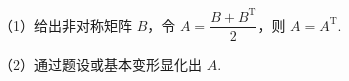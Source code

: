 %






（1）给出非对称矩阵 $B$，令 $A=\dfrac{B+B^{\mathrm T}}{2}$，则 $A=A^{\mathrm T}$.

（2）通过题设或基本变形显化出 $A$.

